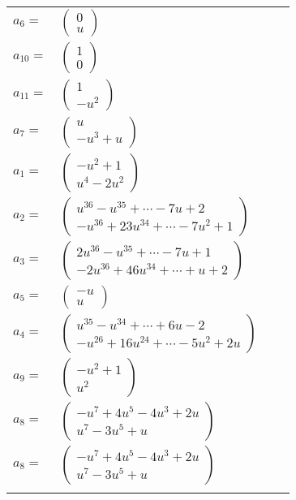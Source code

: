\documentclass[1p]{elsarticle_modified}
\theoremstyle{definition}
\begin{document}
\begin{tabular}{m{7pt} m{180pt} m{7pt} m{180pt} }
\flushright $a_{6}=$&$\begin{pmatrix}0\\u\end{pmatrix}$ \\
\flushright $a_{10}=$&$\begin{pmatrix}1\\0\end{pmatrix}$ \\
\flushright $a_{11}=$&$\begin{pmatrix}1\\- u^2\end{pmatrix}$ \\
\flushright $a_{7}=$&$\begin{pmatrix}u\\- u^3+u\end{pmatrix}$ \\
\flushright $a_{1}=$&$\begin{pmatrix}- u^2+1\\u^4-2 u^2\end{pmatrix}$ \\
\flushright $a_{2}=$&$\begin{pmatrix}u^{36}- u^{35}+\cdots-7 u+2\\- u^{36}+23 u^{34}+\cdots-7 u^2+1\end{pmatrix}$ \\
\flushright $a_{3}=$&$\begin{pmatrix}2 u^{36}- u^{35}+\cdots-7 u+1\\-2 u^{36}+46 u^{34}+\cdots+u+2\end{pmatrix}$ \\
\flushright $a_{5}=$&$\begin{pmatrix}- u\\u\end{pmatrix}$ \\
\flushright $a_{4}=$&$\begin{pmatrix}u^{35}- u^{34}+\cdots+6 u-2\\- u^{26}+16 u^{24}+\cdots-5 u^2+2 u\end{pmatrix}$ \\
\flushright $a_{9}=$&$\begin{pmatrix}- u^2+1\\u^2\end{pmatrix}$ \\
\flushright $a_{8}=$&$\begin{pmatrix}- u^7+4 u^5-4 u^3+2 u\\u^7-3 u^5+u\end{pmatrix}$\\ \flushright $a_{8}=$&$\begin{pmatrix}- u^7+4 u^5-4 u^3+2 u\\u^7-3 u^5+u\end{pmatrix}$\\&\end{tabular}
\end{document}
